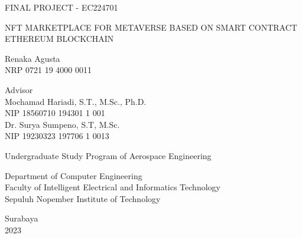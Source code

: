 \begin{large}
  FINAL PROJECT - EC224701
\end{large}

\vspace{\fill}

\begin{spacing}{1.5}
  \begin{Large}
    NFT MARKETPLACE FOR METAVERSE BASED ON SMART CONTRACT ETHEREUM BLOCKCHAIN
  \end{Large}
\end{spacing}

\vspace{\fill}

\begin{large}
  Renaka Agusta \\
  \textnormal{NRP 0721 19 4000 0011}
\end{large}

\vspace{\fill}

\begin{large}
  \textnormal{Advisor} \\
  Mochamad Hariadi, S.T., M.Sc., Ph.D. \\
  \textnormal{NIP 18560710 194301 1 001} \\
  Dr. Surya Sumpeno, S.T, M.Sc. \\
  \textnormal{NIP 19230323 197706 1 0013}
\end{large}

\vspace{\fill}

Undergraduate Study Program of Aerospace Engineering \\

\normalfont

Department of Computer Engineering \\
Faculty of Intelligent Electrical and Informatics Technology \\
Sepuluh Nopember Institute of Technology

Surabaya \\
2023

